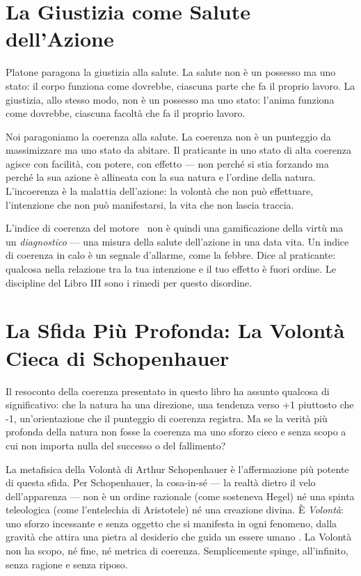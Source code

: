 \section{La Giustizia come Salute dell'Azione}

Platone paragona la giustizia alla salute. La salute non \`e un possesso
ma uno stato: il corpo funziona come dovrebbe, ciascuna parte che fa il
proprio lavoro. La giustizia, allo stesso modo, non \`e un possesso ma
uno stato: l'anima funziona come dovrebbe, ciascuna facolt\`a che fa il
proprio lavoro.

Noi paragoniamo la coerenza alla salute. La coerenza non \`e un punteggio
da massimizzare ma uno stato da abitare. Il praticante in uno stato di
alta coerenza agisce con facilit\`a, con potere, con effetto --- non
perch\'e si stia forzando ma perch\'e la sua azione \`e allineata con
la sua natura e l'ordine della natura. L'incoerenza \`e la malattia
dell'azione: la volont\`a che non pu\`o effettuare, l'intenzione che
non pu\`o manifestarsi, la vita che non lascia traccia.

L'indice di coerenza del motore \physis\ non \`e quindi una
gamificazione della virt\`u ma un \emph{diagnostico} --- una misura
della salute dell'azione in una data vita. Un indice di coerenza in
calo \`e un segnale d'allarme, come la febbre. Dice al praticante:
qualcosa nella relazione tra la tua intenzione e il tuo effetto \`e
fuori ordine. Le discipline del Libro III sono i rimedi per questo
disordine.

\section{La Sfida Pi\`u Profonda: La Volont\`a Cieca di Schopenhauer}

Il resoconto della coerenza presentato in questo libro ha assunto
qualcosa di significativo: che la natura ha una direzione, una tendenza
verso +1 piuttosto che -1, un'orientazione che il punteggio di coerenza
registra. Ma se la verit\`a pi\`u profonda della natura non fosse la
coerenza ma uno sforzo cieco e senza scopo a cui non importa nulla del
successo o del fallimento?

La metafisica della Volont\`a di Arthur Schopenhauer \`e
l'affermazione pi\`u potente di questa sfida. Per Schopenhauer, la
cosa-in-s\'e --- la realt\`a dietro il velo dell'apparenza --- non
\`e un ordine razionale (come sosteneva Hegel) n\'e una spinta
teleologica (come l'entelechia di Aristotele) n\'e una creazione divina.
\`E \emph{Volont\`a}: uno sforzo incessante e senza oggetto che si
manifesta in ogni fenomeno, dalla gravit\`a che attira una pietra al
desiderio che guida un essere umano \parencite{schopenhauer1818will}.
La Volont\`a non ha scopo, n\'e fine, n\'e metrica di coerenza.
Semplicemente spinge, all'infinito, senza ragione e senza riposo.


